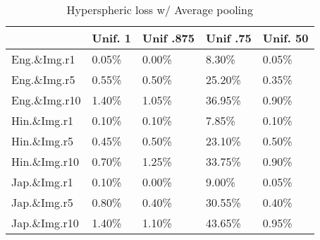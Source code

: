 
\begin{table}
    \centering
    \begin{tabular}{l|l|l|l|l}
        \toprule
        {} & Unif. 1 & Unif .875 & Unif .75 & Unif. 50 \\
        \midrule
        Eng.\&Img.r1  &            0.05\% &                 0.00\% &                8.30\% &                0.05\% \\
        Eng.\&Img.r5  &            0.55\% &                 0.50\% &               25.20\% &                0.35\% \\
        Eng.\&Img.r10 &            1.40\% &                 1.05\% &               36.95\% &                0.90\% \\
        \midrule
        Hin.\&Img.r1  &            0.10\% &                 0.10\% &                7.85\% &                0.10\% \\
        Hin.\&Img.r5  &            0.45\% &                 0.50\% &               23.10\% &                0.50\% \\
        Hin.\&Img.r10 &            0.70\% &                 1.25\% &               33.75\% &                0.90\% \\
        \midrule
        Jap.\&Img.r1  &            0.10\% &                 0.00\% &                9.00\% &                0.05\% \\
        Jap.\&Img.r5  &            0.80\% &                 0.40\% &               30.55\% &                0.40\% \\
        Jap.\&Img.r10 &            1.40\% &                 1.10\% &               43.65\% &                0.95\% \\
\end{tabular}


\caption{Hyperspheric loss  w/ Average pooling}
\label{table:hyper_img_ret}
\end{table}
